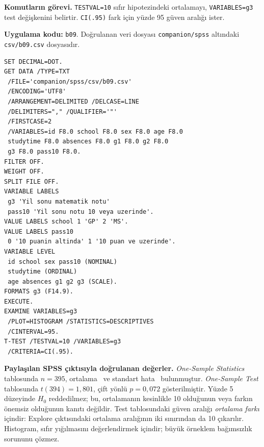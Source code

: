 {\raggedright
\noindent\textbf{Komutların görevi.} \texttt{TESTVAL=10} sıfır hipotezindeki ortalamayı, \texttt{VARIABLES=g3} test değişkenini belirtir. \texttt{CI(.95)} fark için yüzde 95 güven aralığı ister.\par}

\textbf{Uygulama kodu:} \texttt{b09}. Doğrulanan veri dosyası
\texttt{companion/spss} altındaki \texttt{csv/b09.csv} dosyasıdır.

\begin{lstlisting}[style=prismSPSS]
SET DECIMAL=DOT.
GET DATA /TYPE=TXT
 /FILE='companion/spss/csv/b09.csv'
 /ENCODING='UTF8'
 /ARRANGEMENT=DELIMITED /DELCASE=LINE
 /DELIMITERS="," /QUALIFIER='"'
 /FIRSTCASE=2
 /VARIABLES=id F8.0 school F8.0 sex F8.0 age F8.0
 studytime F8.0 absences F8.0 g1 F8.0 g2 F8.0
 g3 F8.0 pass10 F8.0.
FILTER OFF.
WEIGHT OFF.
SPLIT FILE OFF.
VARIABLE LABELS
 g3 'Yil sonu matematik notu'
 pass10 'Yil sonu notu 10 veya uzerinde'.
VALUE LABELS school 1 'GP' 2 'MS'.
VALUE LABELS pass10
 0 '10 puanin altinda' 1 '10 puan ve uzerinde'.
VARIABLE LEVEL
 id school sex pass10 (NOMINAL)
 studytime (ORDINAL)
 age absences g1 g2 g3 (SCALE).
FORMATS g3 (F14.9).
EXECUTE.
EXAMINE VARIABLES=g3
 /PLOT=HISTOGRAM /STATISTICS=DESCRIPTIVES
 /CINTERVAL=95.
T-TEST /TESTVAL=10 /VARIABLES=g3
 /CRITERIA=CI(.95).
\end{lstlisting}

\begin{outputguidebox}
\textbf{Paylaşılan SPSS çıktısıyla doğrulanan değerler.}
\emph{One-Sample Statistics} tablosunda $n=395$, ortalama \SPMatMean\ ve
standart hata \SPMatSE\ bulunmuştur. \emph{One-Sample Test} tablosunda
$t(394)=1{,}801$, çift yönlü $p=0{,}072$ gösterilmiştir. Yüzde 5 düzeyinde
$H_0$ reddedilmez; bu, ortalamanın kesinlikle 10 olduğunun veya farkın
önemsiz olduğunun kanıtı değildir. Test tablosundaki güven aralığı
\emph{ortalama farkı} içindir: Explore çıktısındaki ortalama aralığının
iki sınırından da 10 çıkarılır. Histogram, sıfır yığılmasını değerlendirmek
içindir; büyük örneklem bağımsızlık sorununu çözmez.
\end{outputguidebox}


